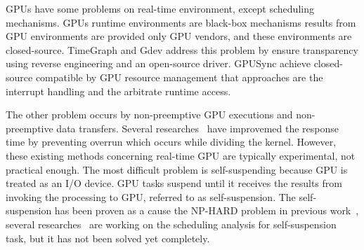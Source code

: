 GPUs have some problems on real-time environment, except  scheduling mechanisms.
GPUs runtime environments are black-box mechanisms results from GPU environments are provided only GPU vendors, and these environments are closed-source.
TimeGraph and Gdev address this problem by ensure transparency using reverse engineering and an open-source driver.
GPUSync achieve closed-source compatible by GPU resource management that approaches are the interrupt handling and the arbitrate runtime access.

The other problem occurs by non-preemptive GPU executions and non-preemptive data transfers.
Several researches~\cite{basaran:preemptive,sparc} have improvemed the response time by preventing overrun which occurs while dividing the kernel.
However, these existing methods concerning real-time GPU are typically experimental, not practical enough.
The most difficult problem is self-suspending because GPU is treated as an I/O device.
GPU tasks suspend until it receives the results from invoking the processing to GPU, referred to as self-suspension.
The self-suspension has been proven as a cause the NP-HARD problem in previous work~\cite{self-sus:1,self-sus:2},
several researches~\cite{chattopadhyay2014limited,kim2013segment} are working on the scheduling analysis for self-suspension task, but it has not been solved yet completely.

